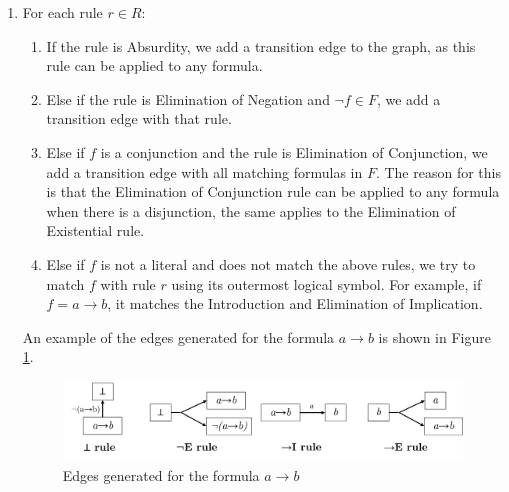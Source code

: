 \documentclass[runningheads]{llncs}
\begin{document}
\begin{enumerate}
       \begin{enumerate}
            \item For each rule \(r \in R\):

            \begin{enumerate}
                \item If the rule is Absurdity, we add a transition edge to the graph, as this rule can be applied to any formula.
                \item Else if the rule is Elimination of Negation and \(\lnot f \in F\), we add a transition edge with that rule.
                \item Else if \(f\) is a conjunction and the rule is Elimination of Conjunction, we add a transition edge with all matching formulas in \(F\). The reason for this is that the Elimination of Conjunction rule can be applied to any formula when there is a disjunction, the same applies to the Elimination of Existential rule.
                \item Else if \(f\) is not a literal and does not match the above rules, we try to match \(f\) with rule \(r\) using its outermost logical symbol. For example, if \(f = a \to b\), it matches the Introduction and Elimination of Implication.
            \end{enumerate}  

            An example of the edges generated for the formula \(a \to b\) is shown in Figure \ref{fig:tg-edges}.
            \vspace{-1em}
            \begin{figure}[H]
                \centering
                \includegraphics[width=1\linewidth]{resources/tg-edges.png}
                \caption{Edges generated for the formula \(a \to b\)}
                \label{fig:tg-edges}
            \end{figure}
 \vspace{-2em}
    \end{enumerate}    


\end{enumerate}
\end{document}
